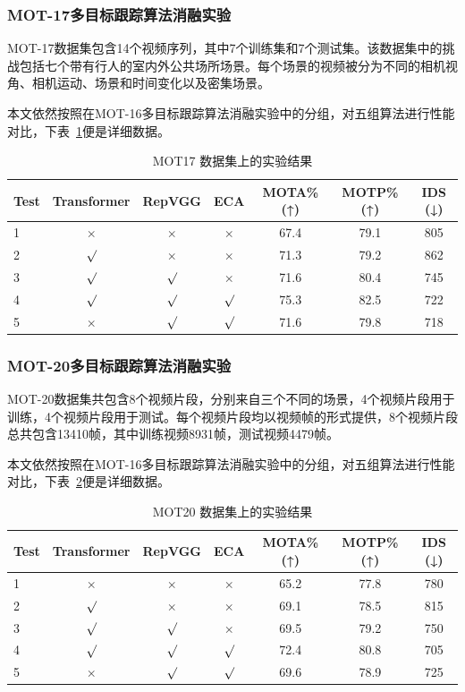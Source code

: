 \subsubsection{MOT-17多目标跟踪算法消融实验}
MOT-17数据集包含14个视频序列，其中7个训练集和7个测试集。该数据集中的挑战包括七个带有行人的室内外公共场所场景。每个场景的视频被分为不同的相机视角、相机运动、场景和时间变化以及密集场景。

本文依然按照在MOT-16多目标跟踪算法消融实验中的分组，对五组算法进行性能对比，下表~\ref{tab:mot17_results}便是详细数据。

\begin{table}[htbp]
	\centering
	\caption{MOT17 数据集上的实验结果}
	\label{tab:mot17_results}
	\begin{tabular}{@{}lcccccc@{}}
		\toprule
		Test & Transformer & RepVGG & ECA & MOTA\% (↑) & MOTP\% (↑) & IDS (↓) \\
		\midrule
		1 & $\times$ & $\times$ & $\times$ & 67.4 & 79.1 & 805 \\
		2 & $\surd$ & $\times$ & $\times$ & 71.3 & 79.2 & 862 \\
		3 & $\surd$ & $\surd$ & $\times$ & 71.6 & 80.4 & 745 \\
		4 & $\surd$ & $\surd$ & $\surd$ & 75.3 & 82.5 & 722 \\
		5 & $\times$ & $\surd$ & $\surd$ & 71.6 & 79.8 & 718 \\
		\bottomrule
	\end{tabular}
\end{table}






\subsubsection{MOT-20多目标跟踪算法消融实验}
MOT-20数据集共包含8个视频片段，分别来自三个不同的场景，4个视频片段用于训练，4个视频片段用于测试。每个视频片段均以视频帧的形式提供，8个视频片段总共包含13410帧，其中训练视频8931帧，测试视频4479帧。

本文依然按照在MOT-16多目标跟踪算法消融实验中的分组，对五组算法进行性能对比，下表~\ref{tab:mot20_results}便是详细数据。
\begin{table}[htbp]
	\centering
	\caption{MOT20 数据集上的实验结果}
	\label{tab:mot20_results}
	\begin{tabular}{@{}lcccccc@{}}
		\toprule
		Test & Transformer & RepVGG & ECA & MOTA\% (↑) & MOTP\% (↑) & IDS (↓) \\
		\midrule
		1 & $\times$ & $\times$ & $\times$ & 65.2 & 77.8 & 780 \\
		2 & $\surd$ & $\times$ & $\times$ & 69.1 & 78.5 & 815 \\
		3 & $\surd$ & $\surd$ & $\times$ & 69.5 & 79.2 & 750 \\
		4 & $\surd$ & $\surd$ & $\surd$ & 72.4 & 80.8 & 705 \\
		5 & $\times$ & $\surd$ & $\surd$ & 69.6 & 78.9 & 725 \\
		\bottomrule
	\end{tabular}
\end{table}

